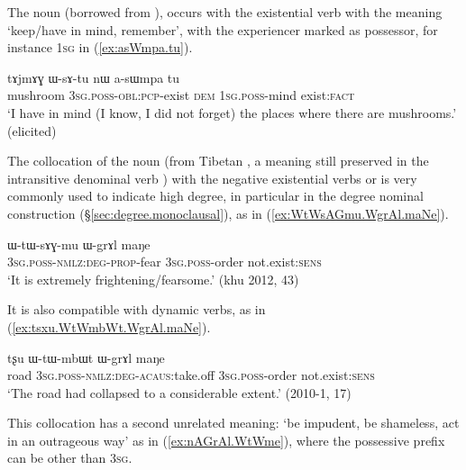 The noun  (borrowed from ),  occurs with the existential verb  with the meaning `keep/have in mind, remember', with the experiencer marked as possessor, for instance \textsc{1sg} in (\ref{ex:asWmpa.tu}).

\begin{exe}
\ex \label{ex:asWmpa.tu}
\gll  tɤjmɤɣ ɯ-sɤ-tu nɯ a-sɯmpa tu \\
mushroom \textsc{3sg}.\textsc{poss}-\textsc{obl}:\textsc{pcp}-exist \textsc{dem} \textsc{1sg}.\textsc{poss}-mind exist:\textsc{fact} \\
\glt `I have in mind (I know, I did not forget) the places where there are mushrooms.' (elicited)
\end{exe}

The collocation of the noun  (from Tibetan , a meaning still preserved in the intransitive denominal verb ) with the negative existential verbs  or  is very commonly used to indicate high degree,  in particular in the degree nominal construction (§\ref{sec:degree.monoclausal}), as in (\ref{ex:WtWsAGmu.WgrAl.maNe}).

\begin{exe}
\ex \label{ex:WtWsAGmu.WgrAl.maNe}
\gll  ɯ-tɯ-sɤɣ-mu ɯ-grɤl maŋe \\
\textsc{3sg}.\textsc{poss}-\textsc{nmlz}:\textsc{deg}-\textsc{prop}-fear \textsc{3sg}.\textsc{poss}-order not.exist:\textsc{sens} \\
\glt `It is extremely frightening/fearsome.' (khu 2012, 43)
\end{exe}

It is also compatible with dynamic verbs, as in (\ref{ex:tsxu.WtWmbWt.WgrAl.maNe}).

\begin{exe}
\ex \label{ex:tsxu.WtWmbWt.WgrAl.maNe}
\gll  tʂu ɯ-tɯ-mbɯt ɯ-grɤl maŋe \\
road \textsc{3sg}.\textsc{poss}-\textsc{nmlz}:\textsc{deg}-\textsc{acaus}:take.off  \textsc{3sg}.\textsc{poss}-order not.exist:\textsc{sens}  \\
\glt `The road had collapsed to a considerable extent.' (2010-1, 17)
\end{exe}


This collocation has a second unrelated meaning: `be impudent, be shameless, act in an outrageous way' as in (\ref{ex:nAGrAl.WtWme}), where the possessive prefix can be other than \textsc{3sg}.

